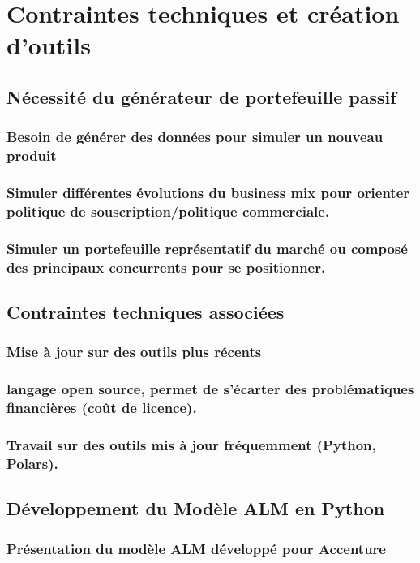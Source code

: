 \chapter{Contraintes techniques et création d'outils}
\section{Nécessité du générateur de portefeuille passif}
\subsection{Besoin de générer des données pour simuler un nouveau produit}
\subsection{Simuler différentes évolutions du business mix pour orienter politique de souscription/politique commerciale.}
\subsection{Simuler un portefeuille représentatif du marché ou composé des principaux concurrents pour se positionner.}
\section{Contraintes techniques associées}
\subsection{Mise à jour sur des outils plus récents}
\subsection{langage open source, permet de s'écarter des problématiques financières (coût de licence).}
\subsection{Travail sur des outils mis à jour fréquemment (Python, Polars).}

\section{Développement du Modèle ALM en Python}
\subsection{Présentation du modèle ALM développé pour Accenture}
